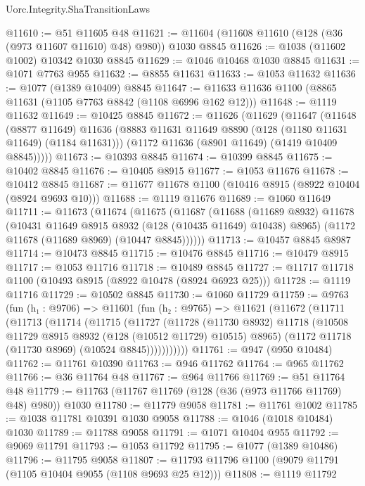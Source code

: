 \begin{lexlean}{Uorc.Integrity.ShaTransitionLaws}
\begin{coremodule}
@11610 := @51 @11605 @48
@11621 := @11604 (@11608 @11610 (@128 (@36 (@973 @11607 @11610) @48) @980)) @1030 @8845
@11626 := @1038 (@11602 @1002) @10342 @1030 @8845
@11629 := @1046 @10468 @1030 @8845
@11631 := @1071 @7763 @955
@11632 := @8855 @11631
@11633 := @1053 @11632
@11636 := @1077 (@1389 @10409) @8845
@11647 := @11633 @11636 @1100 (@8865 @11631 (@1105 @7763 @8842 (@1108 @6996 @162 @12)))
@11648 := @1119 @11632
@11649 := @10425 @8845
@11672 := @11626
    (@11629
      (@11647
        (@11648
          (@8877 @11649)
          @11636
          (@8883 @11631 @11649 @8890 (@128 (@1180 @11631 @11649) (@1184 @11631)))
          (@1172 @11636 (@8901 @11649) (@1419 @10409 @8845)))))
@11673 := @10393 @8845
@11674 := @10399 @8845
@11675 := @10402 @8845
@11676 := @10405 @8915
@11677 := @1053 @11676
@11678 := @10412 @8845
@11687 := @11677 @11678 @1100 (@10416 @8915 (@8922 @10404 (@8924 @9693 @10)))
@11688 := @1119 @11676
@11689 := @1060 @11649
@11711 := @11673
    (@11674
      (@11675
        (@11687
          (@11688
            (@11689 @8932)
            @11678
            (@10431 @11649 @8915 @8932 (@128 (@10435 @11649) @10438) @8965)
            (@1172 @11678 (@11689 @8969) (@10447 @8845))))))
@11713 := @10457 @8845 @8987
@11714 := @10473 @8845
@11715 := @10476 @8845
@11716 := @10479 @8915
@11717 := @1053 @11716
@11718 := @10489 @8845
@11727 := @11717 @11718 @1100 (@10493 @8915 (@8922 @10478 (@8924 @6923 @25)))
@11728 := @1119 @11716
@11729 := @10502 @8845
@11730 := @1060 @11729
@11759 := @9763
    (fun (h₁ : @9706) =>
    @11601
      (fun (h₂ : @9765) =>
      @11621
        (@11672
          (@11711
            (@11713
              (@11714
                (@11715
                  (@11727
                    (@11728
                      (@11730 @8932)
                      @11718
                      (@10508 @11729 @8915 @8932 (@128 (@10512 @11729) @10515) @8965)
                      (@1172 @11718 (@11730 @8969) (@10524 @8845)))))))))))
@11761 := @947 (@950 @10484)
@11762 := @11761 @10390
@11763 := @946 @11762
@11764 := @965 @11762
@11766 := @36 @11764 @48
@11767 := @964 @11766
@11769 := @51 @11764 @48
@11779 := @11763 (@11767 @11769 (@128 (@36 (@973 @11766 @11769) @48) @980)) @1030
@11780 := @11779 @9058
@11781 := @11761 @1002
@11785 := @1038 @11781 @10391 @1030 @9058
@11788 := @1046 (@1018 @10484) @1030
@11789 := @11788 @9058
@11791 := @1071 @10404 @955
@11792 := @9069 @11791
@11793 := @1053 @11792
@11795 := @1077 (@1389 @10486)
@11796 := @11795 @9058
@11807 := @11793 @11796 @1100 (@9079 @11791 (@1105 @10404 @9055 (@1108 @9693 @25 @12)))
@11808 := @1119 @11792

\end{coremodule}
\end{lexlean}
